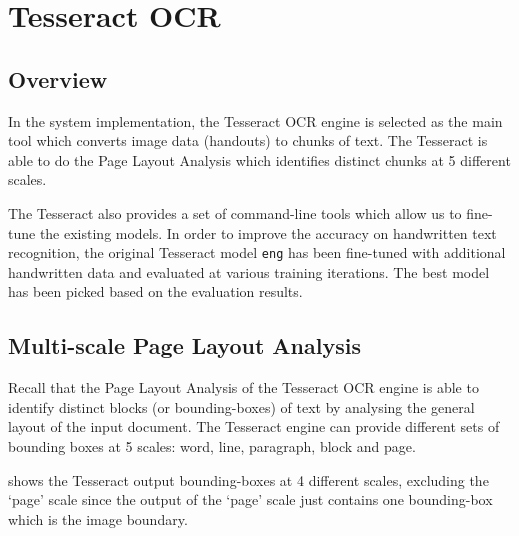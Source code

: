 
\chapter{Tesseract OCR}
\label{chap:tess-ocr}

\ifpdf
    \graphicspath{{Chapter4/Figs/Raster/}{Chapter4/Figs/PDF/}{Chapter4/Figs/}}
\else
    \graphicspath{{Chapter4/Figs/Vector/}{Chapter4/Figs/}}
\fi

\section{Overview}

In the system implementation, the Tesseract OCR engine is selected as the main tool which converts image data (handouts) to chunks of text. The Tesseract is able to do the Page Layout Analysis which identifies distinct chunks at 5 different scales. 

The Tesseract also provides a set of command-line tools which allow us to fine-tune the existing models. In order to improve the accuracy on handwritten text recognition, the original Tesseract model \texttt{eng} has been fine-tuned with additional handwritten data and evaluated at various training iterations. The best model has been picked based on the evaluation results.

\section{Multi-scale Page Layout Analysis}

Recall that the Page Layout Analysis of the Tesseract OCR engine is able to identify distinct blocks (or bounding-boxes) of text by analysing the general layout of the input document. The Tesseract engine can provide different sets of bounding boxes at 5 scales: word, line, paragraph, block and page.

 shows the Tesseract output bounding-boxes at 4 different scales, excluding the `page' scale since the output of the `page' scale just contains one bounding-box which is the image boundary.

